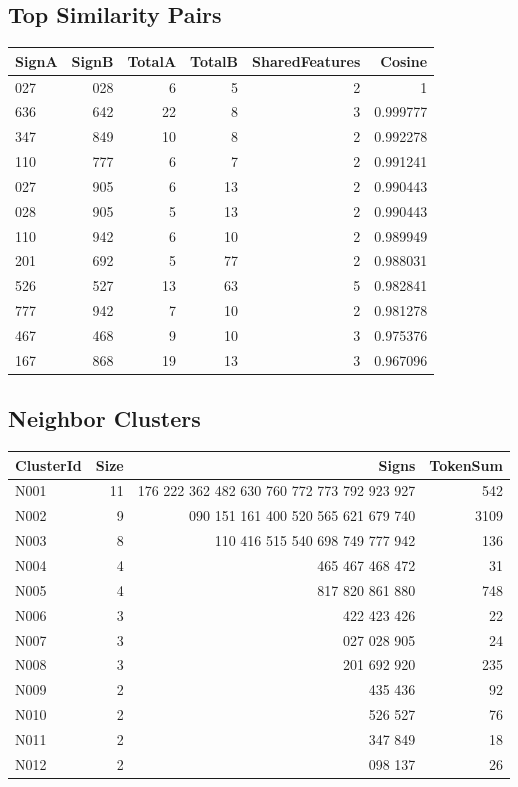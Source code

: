 ﻿\documentclass[11pt,a4paper]{article}
\begin{document}
\subsection*{Top Similarity Pairs}
\begin{center}
\begin{tabular}{lrrrrr}
\toprule
\textbf{SignA} & \textbf{SignB} & \textbf{TotalA} & \textbf{TotalB} & \textbf{SharedFeatures} & \textbf{Cosine} \\
\midrule
027 & 028 & 6 & 5 & 2 & 1 \\
636 & 642 & 22 & 8 & 3 & 0.999777 \\
347 & 849 & 10 & 8 & 2 & 0.992278 \\
110 & 777 & 6 & 7 & 2 & 0.991241 \\
027 & 905 & 6 & 13 & 2 & 0.990443 \\
028 & 905 & 5 & 13 & 2 & 0.990443 \\
110 & 942 & 6 & 10 & 2 & 0.989949 \\
201 & 692 & 5 & 77 & 2 & 0.988031 \\
526 & 527 & 13 & 63 & 5 & 0.982841 \\
777 & 942 & 7 & 10 & 2 & 0.981278 \\
467 & 468 & 9 & 10 & 3 & 0.975376 \\
167 & 868 & 19 & 13 & 3 & 0.967096 \\
\bottomrule
\end{tabular}
\end{center}

\subsection*{Neighbor Clusters}
\begin{center}
\begin{tabular}{lrrr}
\toprule
\textbf{ClusterId} & \textbf{Size} & \textbf{Signs} & \textbf{TokenSum} \\
\midrule
N001 & 11 & 176 222 362 482 630 760 772 773 792 923 927 & 542 \\
N002 & 9 & 090 151 161 400 520 565 621 679 740 & 3109 \\
N003 & 8 & 110 416 515 540 698 749 777 942 & 136 \\
N004 & 4 & 465 467 468 472 & 31 \\
N005 & 4 & 817 820 861 880 & 748 \\
N006 & 3 & 422 423 426 & 22 \\
N007 & 3 & 027 028 905 & 24 \\
N008 & 3 & 201 692 920 & 235 \\
N009 & 2 & 435 436 & 92 \\
N010 & 2 & 526 527 & 76 \\
N011 & 2 & 347 849 & 18 \\
N012 & 2 & 098 137 & 26 \\
\bottomrule
\end{tabular}
\end{center}
\end{document}
